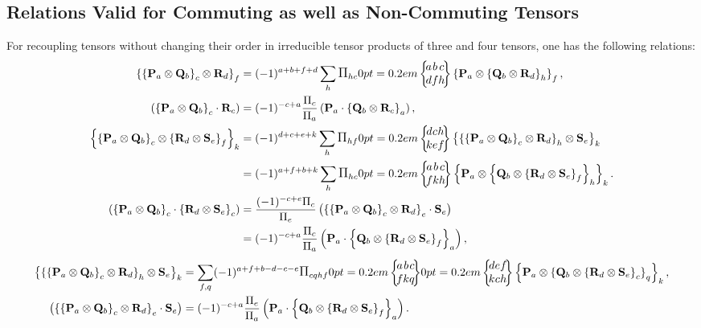\subsection{Relations Valid for Commuting as well as Non-Commuting Tensors}\label{sec:3.3.1}
For recoupling tensors without changing their order in irreducible tensor products of three and four tensors, one has the following relations:
\begin{align}
\left\{\left\{\vect{P}_{a} \otimes \vect{Q}_{b}\right\}_{c} \otimes \vect{R}_{d}\right\}_{f}&=(-1)^{a+b+f+d} \sum_{h} \Fact{h c}\sixj{a }{ b }{ c }{d }{ f }{ h}\left\{\vect{P}_{a} \otimes\left\{\vect{Q}_{b} \otimes \vect{R}_{d}\right\}_{h}\right\}_{f}  ,\label{eq:3:3:1}\\
\left(\left\{\vect{P}_{a} \otimes \vect{Q}_{b}\right\}_{c} \cdot \vect{R}_{c}\right)&=(-1)^{-c+a} \frac{\Fact{c}}{\Fact{a}}\left(\vect{P}_{a} \cdot\left\{\vect{Q}_{b} \otimes \vect{R}_{c}\right\}_{a}\right),  \label{eq:3:3:2}\\
\left\{\left\{\vect{P}_{a} \otimes \vect{Q}_{b}\right\}_{c} \otimes\left\{\vect{R}_{d} \otimes \vect{S}_{e}\right\}_{f}\right\}_{k}&=(-1)^{d+c+e+k} \sum_{h} \Fact{h f}\sixj{d}{c}{h}{k}{e}{f}
\left\{\left\{\left\{\vect{P}_{a} \otimes \vect{Q}_{b}\right\}_{c} \otimes \vect{R}_{d}\right\}_{h} \otimes \vect{S}_{e}\right\}_{k}  \notag\\
&=(-1)^{a+f+b+k} \sum_{h} \Fact{h c}\sixj{a }{ b }{ c }{f }{ k }{ h}\left\{\vect{P}_{a} \otimes\left\{\vect{Q}_{b} \otimes\left\{\vect{R}_{d} \otimes \vect{S}_{e}\right\}_{f}\right\}_{h}\right\}_{k} .\label{eq:3:3:3}\\
\left(\left\{\vect{P}_{a} \otimes \vect{Q}_{b}\right\}_{c} \cdot\left\{\vect{R}_{d} \otimes \vect{S}_{e}\right\}_{c}\right)&=\frac{(-1)^{-c+e} \Fact{c}}{\Fact{e}}\left(\left\{\left\{\vect{P}_{a} \otimes \vect{Q}_{b}\right\}_{c} \otimes \vect{R}_{d}\right\}_{e} \cdot \vect{S}_{e}\right)\notag\\
&=(-1)^{-c+a} \frac{\Fact{c}}{\Fact{a}}\left(\vect{P}_{a} \cdot\left\{\vect{Q}_{b} \otimes\left\{\vect{R}_{d} \otimes \vect{S}_{e}\right\}_{f}\right\}_{a}\right),  \label{eq:3:3:4}
\end{align}
\begin{align}
\left\{\left\{\left\{\vect{P}_{a} \otimes \vect{Q}_{b}\right\}_{c} \otimes \vect{R}_{d}\right\}_{h} \otimes \vect{S}_{e}\right\}_{k}&=\sum_{f, q}(-1)^{a+f+b-d-c-e} \Fact{c q h f}\sixj{a }{ b }{ c }{f }{ k }{ q}\sixj{d}{e}{f}{k}{c}{h}
\left\{\vect{P}_{a} \otimes\left\{\vect{Q}_{b} \otimes\left\{\vect{R}_{d} \otimes \vect{S}_{e}\right\}_{c}\right\}_{q}\right\}_{k},  \label{eq:3:3:5}\\
\left(\left\{\left\{\vect{P}_{a} \otimes \vect{Q}_{b}\right\}_{c} \otimes \vect{R}_{d}\right\}_{e} \cdot \vect{S}_{e}\right)&=(-1)^{-c+a} \frac{\Fact{e}}{\Fact{a}}\left(\vect{P}_{a} \cdot\left\{\vect{Q}_{b} \otimes\left\{\vect{R}_{d} \otimes \vect{S}_{e}\right\}_{f}\right\}_{a}\right) .\label{eq:3:3:6}
\end{align}
